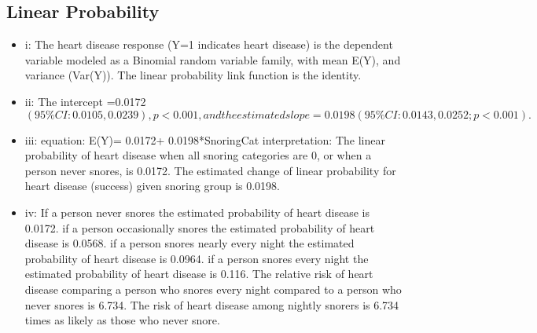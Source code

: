 \documentclass{article}
\begin{document}
\subsection{Linear Probability}
 \begin{itemize}
     \item i:   The heart disease response (Y=1 indicates heart disease) is the dependent variable modeled as a Binomial random variable family, with mean E(Y), and variance (Var(Y)).  The linear probability link function is the identity. 
     \item ii:  The intercept =0.0172 $(95\%CI: 0.0105, 0.0239), p<0.001, and the estimated slope= 0.0198 (95\% CI : 0.0143,0.0252; p<0.001).$
     \item iii:  equation: E(Y)= 0.0172+ 0.0198*SnoringCat interpretation: The linear probability of heart disease when all snoring categories are 0, or when a person never snores, is 0.0172.  The estimated change of linear probability for heart disease (success) given snoring group is 0.0198.
 \item iv:  If a person never snores the estimated probability of heart disease is 0.0172.
 if a person occasionally snores the estimated probability of heart disease is 0.0568.
 if a person snores nearly every night the estimated probability of heart disease is 0.0964.
 if a person snores every night the estimated probability of heart disease is 0.116. The relative risk of heart disease comparing a person who snores every night compared to a person who never snores is 6.734.  The risk of heart disease among nightly snorers is 6.734 times as likely as those who never snore.
 \end{itemize}
 
\end{document}
